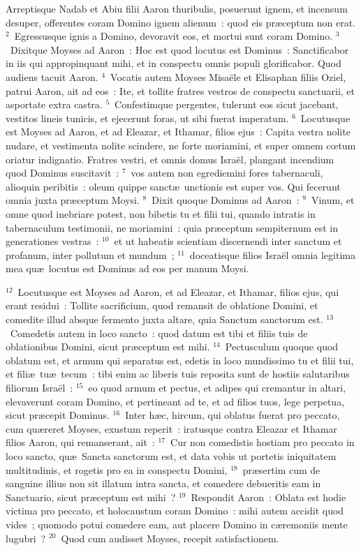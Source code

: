 \lettrine[lines=3,image=true,loversize=0.05,lraise=-0.03]{A}{}rreptisque Nadab et Abiu filii Aaron thuribulis, posuerunt ignem, et incensum desuper, offerentes coram Domino ignem alienum~: quod eis pr\ae ceptum non erat.
${}^{2}$~Egressusque ignis a Domino, devoravit eos, et mortui sunt coram Domino.
${}^{3}$~Dixitque Moyses ad Aaron~: Hoc est quod locutus est Dominus~: Sanctificabor in iis qui appropinquant mihi, et in conspectu omnis populi glorificabor. Quod audiens tacuit Aaron.
${}^{4}$~Vocatis autem Moyses Misa\"ele et Elisaphan filiis Oziel, patrui Aaron, ait ad eos~: Ite, et tollite fratres vestros de conspectu sanctuarii, et asportate extra castra.
${}^{5}$~Confestimque pergentes, tulerunt eos sicut jacebant, vestitos lineis tunicis, et ejecerunt foras, ut sibi fuerat imperatum.
${}^{6}$~Locutusque est Moyses ad Aaron, et ad Eleazar, et Ithamar, filios ejus~: Capita vestra nolite nudare, et vestimenta nolite scindere, ne forte moriamini, et super omnem cœtum oriatur indignatio. Fratres vestri, et omnis domus Isra\"el, plangant incendium quod Dominus suscitavit~:
${}^{7}$~vos autem non egrediemini fores tabernaculi, alioquin peribitis~: oleum quippe sanct\ae\ unctionis est super vos. Qui fecerunt omnia juxta pr\ae ceptum Moysi.
${}^{8}$~Dixit quoque Dominus ad Aaron~:
${}^{9}$~Vinum, et omne quod inebriare potest, non bibetis tu et filii tui, quando intratis in tabernaculum testimonii, ne moriamini~: quia pr\ae ceptum sempiternum est in generationes vestras~:
${}^{10}$~et ut habeatis scientiam discernendi inter sanctum et profanum, inter pollutum et mundum~;
${}^{11}$~doceatisque filios Isra\"el omnia legitima mea qu\ae\ locutus est Dominus ad eos per manum Moysi.


${}^{12}$~Locutusque est Moyses ad Aaron, et ad Eleazar, et Ithamar, filios ejus, qui erant residui~: Tollite sacrificium, quod remansit de oblatione Domini, et comedite illud absque fermento juxta altare, quia Sanctum sanctorum est.
${}^{13}$~Comedetis autem in loco sancto~: quod datum est tibi et filiis tuis de oblationibus Domini, sicut pr\ae ceptum est mihi.
${}^{14}$~Pectusculum quoque quod oblatum est, et armum qui separatus est, edetis in loco mundissimo tu et filii tui, et fili\ae\ tu\ae\ tecum~: tibi enim ac liberis tuis reposita sunt de hostiis salutaribus filiorum Isra\"el~:
${}^{15}$~eo quod armum et pectus, et adipes qui cremantur in altari, elevaverunt coram Domino, et pertineant ad te, et ad filios tuos, lege perpetua, sicut pr\ae cepit Dominus.
${}^{16}$~Inter h\ae c, hircum, qui oblatus fuerat pro peccato, cum qu\ae reret Moyses, exustum reperit~: iratusque contra Eleazar et Ithamar filios Aaron, qui remanserant, ait~:
${}^{17}$~Cur non comedistis hostiam pro peccato in loco sancto, qu\ae\ Sancta sanctorum est, et data vobis ut portetis iniquitatem multitudinis, et rogetis pro ea in conspectu Domini,
${}^{18}$~pr\ae sertim cum de sanguine illius non sit illatum intra sancta, et comedere debueritis eam in Sanctuario, sicut pr\ae ceptum est mihi~?
${}^{19}$~Respondit Aaron~: Oblata est hodie victima pro peccato, et holocaustum coram Domino~: mihi autem accidit quod vides~; quomodo potui comedere eam, aut placere Domino in c\ae remoniis mente lugubri~?
${}^{20}$~Quod cum audisset Moyses, recepit satisfactionem.

